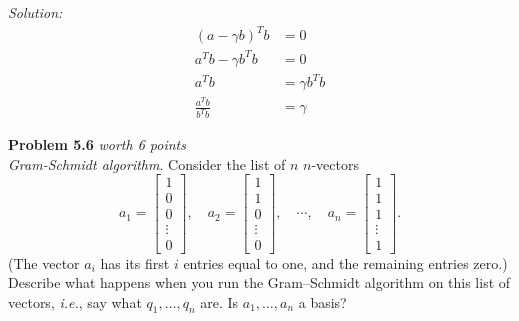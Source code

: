 \documentclass{article}
\newenvironment{problem}[3][Problem]
    { \begin{mdframed}[backgroundcolor=gray!20] \textbf{#1 #2} \textit{worth #3 points} \\}
    {  \end{mdframed}}
\newenvironment{solution}
    {\textit{Solution:}}
    {}
\begin{document}
\begin{solution}
\begin{align*}
    (a-\gamma b)^Tb &= 0\\
    a^Tb - \gamma b^Tb &= 0\\
    a^Tb &= \gamma b^Tb \\
    \frac{a^Tb}{b^Tb} &= \gamma
\end{align*}
\end{solution}
\newpage
\begin{problem}{5.6}{6}
\textit{Gram-Schmidt algorithm}. Consider the list of $n$ $n$-vectors
$$a_1 = \begin{bmatrix}1\\ 0\\ 0\\ \vdots\\ 0\end{bmatrix}, \quad
a_2 = \begin{bmatrix}1\\ 1\\ 0\\ \vdots\\ 0\end{bmatrix}, \quad
\cdots, \quad
a_n = \begin{bmatrix}1\\ 1\\ 1\\ \vdots\\ 1\end{bmatrix}.$$
(The vector $a_i$ has its first $i$ entries equal to one, and the remaining entries zero.) Describe what happens when you run the Gram–Schmidt algorithm on this list of vectors, \textit{i.e.}, say what $q_1, \ldots, q_n$ are. Is $a_1,\ldots,a_n$ a basis?
\end{problem}
\end{document}
